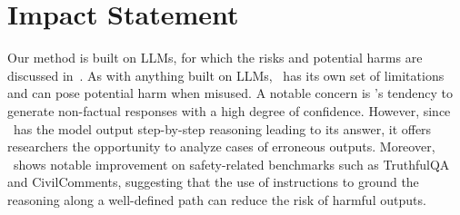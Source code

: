 \section*{Impact Statement}
Our method is built on LLMs, for which the risks and potential harms are discussed in~\citet{brown2020language, openai2023gpt4, touvron2023llama2}. 
As with anything built on LLMs, \method\ has its own set of limitations and can pose potential harm when misused. A notable concern is \method's tendency to generate non-factual responses with a high degree of confidence. However, since \method\ has the model output step-by-step reasoning leading to its answer, it offers researchers the opportunity to analyze cases of erroneous outputs. Moreover, \method\ shows notable improvement on safety-related benchmarks such as TruthfulQA and CivilComments, suggesting that the use of instructions to ground the reasoning along a well-defined path can reduce the risk of harmful outputs.